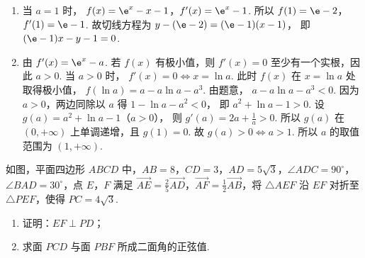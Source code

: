 \begin{solution}
\begin{enumerate}
\item 当 \(a=1\) 时，
\(f(x)=\e^x-x-1\)，\(f'(x)=\e^x-1\).
所以
\(f(1)=\e-2\)，\(f'(1)=\e-1\).
故切线方程为
\(y-(\e-2)=(\e-1)(x-1)\)，
即
\((\e-1)x-y-1=0\).

\item 由
\(f'(x)=\e^x-a\).
若 \(f(x)\) 有极小值，则 \(f'(x)=0\) 至少有一个实根，因此 \(a>0\).
当 \(a>0\) 时，
\(f'(x)=0 \iff x=\ln a\).
此时 \(f(x)\) 在 \(x=\ln a\) 处取得极小值，
\(f(\ln a)=a-a\ln a-a^3\).
由题意，
\(a-a\ln a-a^3<0\).
因为 \(a>0\)，两边同除以 \(a\) 得
\(1-\ln a-a^2<0\)，
即
\(a^2+\ln a-1>0\).
设
\(g(a)=a^2+\ln a-1\)（\(a>0\)），
则
\(g'(a)=2a+\frac1a>0\).
所以 \(g(a)\) 在 \((0,+\infty)\) 上单调递增，且
\(g(1)=0\).
故
\(g(a)>0 \iff a>1\).
所以 \(a\) 的取值范围为 \((1,+\infty)\).
\end{enumerate}
\end{solution}

\begin{problem}
如图，平面四边形 \(ABCD\) 中，\(AB=8\)，\(CD=3\)，\(AD=5\sqrt3\)，\(\angle ADC=90^\circ\)，\(\angle BAD=30^\circ\)，点 \(E\)，\(F\) 满足 \(\overrightarrow{AE}=\frac{2}{5}\overrightarrow{AD}\)，\(\overrightarrow{AF}=\frac{1}{2}\overrightarrow{AB}\)，将 \(\triangle AEF\) 沿 \(EF\) 对折至 \(\triangle PEF\)，使得 \(PC=4\sqrt3\).
\begin{enumerate}
\item 证明：\(EF\perp PD\)；
\item 求面 \(PCD\) 与面 \(PBF\) 所成二面角的正弦值.
\end{enumerate}

\end{problem}

